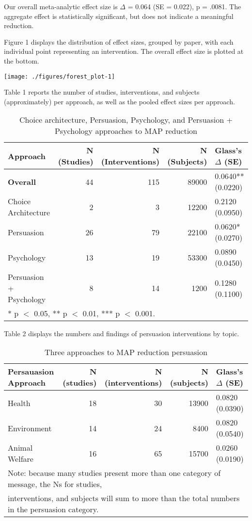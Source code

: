 \documentclass[sn-nature,pdflatex]{sn-jnl}
\begin{document}
Our overall meta-analytic effect size is \(\Delta\) = 0.064 (SE =
0.022), p = .0081. The aggregate effect is statistically significant,
but does not indicate a meaningful reduction.

Figure 1 displays the distribution of effect sizes, grouped by paper,
with each individual point representing an intervention. The overall
effect size is plotted at the bottom.

\texttt{[image: ./figures/forest\_plot-1]}

Table 1 reports the number of studies, interventions, and subjects
(approximately) per approach, as well as the pooled effect sizes per
approach.

\begin{table}[!h]
\centering
\caption{\label{tab:table_one}Choice architecture, Persuasion, Psychology, and Persuasion + Psychology approaches to MAP reduction}
\centering
\begin{tabular}[t]{lrrrl}
\toprule
Approach & N (Studies) & N (Interventions) & N (Subjects) & Glass's $\Delta$ (SE)\\
\midrule
\textbf{Overall} & 44 & 115 & 89000 & 0.0640** (0.0220)\\
Choice Architecture & 2 & 3 & 12200 & 0.2120 (0.0950)\\
Persuasion & 26 & 79 & 22100 & 0.0620* (0.0270)\\
Psychology & 13 & 19 & 53300 & 0.0890 (0.0450)\\
Persuasion + Psychology & 8 & 14 & 1200 & 0.1280 (0.1100)\\
\bottomrule
\multicolumn{5}{l}{\rule{0pt}{1em}* p $<$ 0.05, ** p $<$ 0.01, *** p $<$ 0.001.}\\
\end{tabular}
\end{table}

Table 2 displays the numbers and findings of persuasion interventions by
topic.

\begin{table}[!h]
\centering
\caption{\label{tab:table_two}Three approaches to MAP reduction persuasion}
\centering
\begin{tabular}[t]{lrrrl}
\toprule
Persauasion Approach & N (studies) & N (interventions) & N (subjects) & Glass's $\Delta$ (SE)\\
\midrule
Health & 18 & 30 & 13900 & 0.0820 (0.0390)\\
Environment & 14 & 24 & 8400 & 0.0820 (0.0540)\\
Animal Welfare & 16 & 65 & 15700 & 0.0260 (0.0190)\\
\bottomrule
\multicolumn{5}{l}{\textsuperscript{} Note: because many studies present more than one category of message, the Ns for studies, \linebreak}\\
\multicolumn{5}{l}{interventions, and subjects will sum to more than the total numbers in the persuasion category.}\\
\end{tabular}
\end{table}
\end{document}
